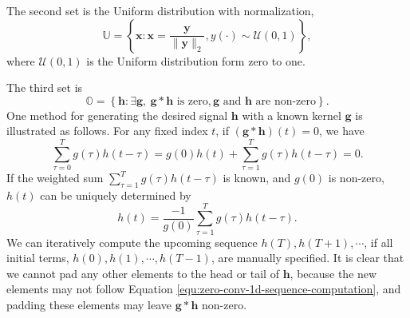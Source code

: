\documentclass[twoside,11pt]{article}
\def\tvar#1{\mathbf{#1}} %
\begin{document}
The second set is the Uniform distribution with normalization,
  \begin{equation*}
    \mathbb{U} = \left\{
    \tvar{x} : \tvar{x} = \dfrac{\tvar{y}}{\|\tvar{y}\|_{2}}, y(\cdot) \sim \mathcal{U}(0, 1)
    \right\},
  \end{equation*}
  where \(\mathcal{U}(0, 1)\) is the Uniform distribution form zero to one.

The third set is
  \begin{equation*}
    \mathbb{O} = \left\{
    \tvar{h} : \exists \tvar{g}, ~ \tvar{g} * \tvar{h} \text{ is zero}, \tvar{g} \text{ and } \tvar{h} \text{ are non-zero}
    \right\}.
  \end{equation*}
  One method for generating the desired signal \(\tvar{h}\) with a known kernel \(\tvar{g}\) is illustrated as follows.
  For any fixed index \(t\), if \((\tvar{g} * \tvar{h})(t) = 0\), we have
  \begin{equation*}
    \sum_{\tau=0}^{T} g(\tau) h(t - \tau)
    = g(0) h(t) + \sum_{\tau=1}^{T} g(\tau) h(t - \tau)
    = 0.
  \end{equation*}
  If the weighted sum \(\sum_{\tau=1}^{T} g(\tau) h(t - \tau)\) is known, and \(g(0)\) is non-zero, \(h(t)\) can be uniquely determined by
  \begin{equation}
    h(t) = \dfrac{- 1}{g(0)} \sum_{\tau=1}^{T} g(\tau) h(t - \tau).
    \label{equ:zero-conv-1d-sequence-computation}
  \end{equation}
  We can iteratively compute the upcoming sequence \(h(T), h(T+1), \cdots\), if all initial terms, \(h(0), h(1), \cdots, h(T-1)\), are manually specified.
  It is clear that we cannot pad any other elements to the head or tail of \(\tvar{h}\), because the new elements may not follow Equation \ref{equ:zero-conv-1d-sequence-computation}, and padding these elements may leave \(\tvar{g} * \tvar{h}\) non-zero.
\end{document}
